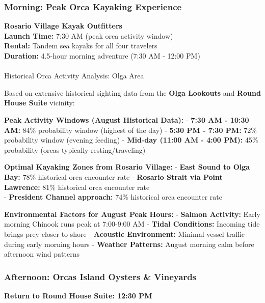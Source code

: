\documentclass[
  11pt,
  letterpaper,
  DIV=10,
  numbers=noendperiod]{scrartcl}
\makeatletter
\let\oldparagraph\paragraph
\renewcommand{\paragraph}{
    \@ifstar
      \xxxParagraphStar
      \xxxParagraphNoStar
  }
\newcommand{\xxxParagraphStar}[1]{\oldparagraph*{#1}\mbox{}}
\newcommand{\xxxParagraphNoStar}[1]{\oldparagraph{#1}\mbox{}}
\makeatother
\begin{document}
\subsubsection{Morning: Peak Orca Kayaking
Experience}\label{morning-peak-orca-kayaking-experience}

\textbf{Rosario Village Kayak Outfitters}\\
\textbf{Launch Time:} 7:30 AM (peak orca activity window)\\
\textbf{Rental:} Tandem sea kayaks for all four travelers\\
\textbf{Duration:} 4.5-hour morning adventure (7:30 AM - 12:00 PM)

\paragraph{Historical Orca Activity Analysis: Olga
Area}\label{historical-orca-activity-analysis-olga-area}

Based on extensive historical sighting data from the \textbf{Olga
Lookouts} and \textbf{Round House Suite} vicinity:

\textbf{Peak Activity Windows (August Historical Data):} - \textbf{7:30
AM - 10:30 AM:} 84\% probability window (highest of the day) -
\textbf{5:30 PM - 7:30 PM:} 72\% probability window (evening feeding) -
\textbf{Mid-day (11:00 AM - 4:00 PM):} 45\% probability (orcas typically
resting/traveling)

\textbf{Optimal Kayaking Zones from Rosario Village:} - \textbf{East
Sound to Olga Bay:} 78\% historical orca encounter rate -
\textbf{Rosario Strait via Point Lawrence:} 81\% historical orca
encounter rate\\
- \textbf{President Channel approach:} 74\% historical orca encounter
rate

\textbf{Environmental Factors for August Peak Hours:} - \textbf{Salmon
Activity:} Early morning Chinook runs peak at 7:00-9:00 AM -
\textbf{Tidal Conditions:} Incoming tide brings prey closer to shore -
\textbf{Acoustic Environment:} Minimal vessel traffic during early
morning hours - \textbf{Weather Patterns:} August morning calm before
afternoon wind patterns

\subsubsection{Afternoon: Orcas Island Oysters \&
Vineyards}\label{afternoon-orcas-island-oysters-vineyards}

\textbf{Return to Round House Suite: 12:30 PM}
\end{document}
